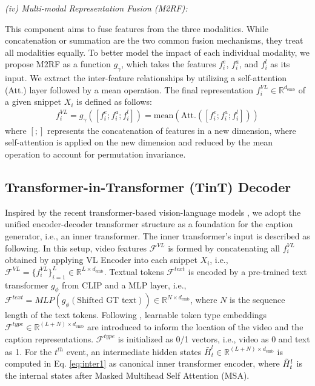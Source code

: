\documentclass[letterpaper]{article} \usepackage{aaai23}  \usepackage{times}  \usepackage{helvet}  \usepackage{courier}  \usepackage[hyphens]{url}  \usepackage{graphicx} \urlstyle{rm} \def\UrlFont{\rm}  \usepackage{natbib}  \usepackage{caption} \frenchspacing  \setlength{\pdfpagewidth}{8.5in}  \setlength{\pdfpageheight}{11in}  \usepackage{algorithm}
\newcommand{\encoder}{VL Encoder\xspace}
\begin{document}
\noindent
\textit{(iv) Multi-modal Representation Fusion (M2RF):}


This component aims to fuse features from the three modalities. While concatenation or summation are the two common fusion mechanisms, they treat all modalities equally. To better model the impact of each individual modality, we propose M2RF as a function $g_\gamma$, which takes the features $f_i^e$, $f_i^a$, and $f_i^l$ as its input.
We extract the inter-feature relationships by utilizing a self-attention (Att.) layer \cite{vaswani2017attention} followed by a mean operation. The final representation $f_i^{VL} \in \mathbb{R}^{d_\text{emb}}$ of a given snippet $X_i$ is defined as follows:
\begin{subequations}
\begin{align}
f_i^{VL} = g_\gamma([f^e_i;f^a_i;f^l_i ]) =\text{mean}(\text{Att.}([f^e_i;f^a_i;f^l_i ])) \label{g_gamma}
\end{align}
\label{eq:m2rf}
\end{subequations}
where $[;]$ represents the concatenation of features in a new dimension, where self-attention is applied on the new dimension and reduced by the mean operation to account for permutation invariance.



\subsection{Transformer-in-Transformer (TinT) Decoder}
\label{sec:TinT}

Inspired by the recent transformer-based vision-language models \cite{Chen2019uniter, lei2020mart}, we adopt the unified encoder-decoder transformer structure as a foundation for the caption generator, i.e., an inner transformer. The inner transformer's input is described as following.
In this setup, video features $\mathcal{F}^{VL}$ is formed by concatenating all $f_i^{VL}$ obtained by applying \encoder into each snippet $X_i$, i.e., $\mathcal{F}^{VL} = \{f_i^{VL}\}^{L}_{i=1}\in \mathbb{R}^{L\times d_{\text{emb}}}$. Textual tokens $\mathcal{F}^{text}$ is encoded by a pre-trained text transformer $g_\phi$ from CLIP and a MLP layer, i.e., $\mathcal{F}^{text} = MLP(g_\phi(\text{Shifted GT text})) \in \mathbb{R}^{N\times d_{\text{emb}}}$, where $N$ is the sequence length of the text tokens. Following \cite{lei2020mart}, learnable token type embeddings $\mathcal{F}^{type} \in \mathbb{R}^{(L+N) \times d_{\text{emb}}}$ are introduced to inform the location of the video and the caption representations. $\mathcal{F}^{type}$ is initialized as 0/1 vectors, i.e., video as 0 and text as 1. For the $t^{th}$ event, an intermediate hidden states $\bar{H}_t^l \in \mathbb{R}^{(L+N) \times d_{\text{emb}}}$ is computed in Eq. \ref{eq:inter1} as canonical inner transformer encoder, where $\Tilde{H}_t^l$ is the internal states after Masked Multihead Self Attention (MSA).
\end{document}
